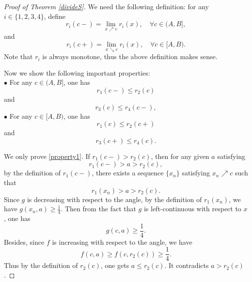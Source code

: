 \documentclass[oneside,english,a4wide]{amsart}
\numberwithin{equation}{section}
\numberwithin{figure}{section}
\theoremstyle{plain}
\theoremstyle{plain}
\theoremstyle{definition}
\theoremstyle{plain}
\theoremstyle{remark}
\theoremstyle{definition}
\theoremstyle{remark}
\theoremstyle{definition}
\newcommand{\8}{\infty}
\begin{document}
\begin{proof}[Proof of Theorem \ref{divideS}]
	
	
	
	\smallskip
	
	We need the following definition: for any $i\in\{1,2,3,4\}$, define
	\begin{equation*}
		r_i(c-)=\lim_{x\nearrow c}r_i(x),\quad \forall c\in (A,B],
	\end{equation*}
    and
	\begin{equation*}
		r_i(c+)=\lim_{x\searrow c}r_i(x),\quad \forall c\in [A,B).
	\end{equation*}
	Note that $r_i$ is always monotone, thus the above definition makes sense. 
	
	\smallskip
	
	Now we show the following important properties:\\
	$\bullet$ For any $c\in (A,B]$, one has 
	\begin{equation}\label{property1}
		r_1(c-)\le r_2(c)
	\end{equation}
     and 
     \begin{equation}\label{property3}
     	r_3(c)\le r_4(c-),
     \end{equation}
     $\bullet$ For any $c\in [A,B)$, one has
     \begin{equation}\label{property2}
     	r_1(c)\le r_2(c+)
     \end{equation}
     and 
     \begin{equation}\label{property4}
     	r_3(c+)\le r_4(c).
     \end{equation}

	We only prove \eqref{property1}. If $r_1(c-)>r_2(c)$, then for any given $a$ satisfying
	\begin{equation*}
		r_1(c-)>a>r_2(c),
	\end{equation*}
	by the definition of $r_1(c-)$, there exists a sequence $\{x_n\}$ satisfying $x_n\nearrow c$ such that
	\begin{equation*}
		r_1(x_n)>a>r_2(c).
	\end{equation*}
	Since $g$ is decreasing with respect to the angle, by the definition of $r_1(x_n)$, we have $g(x_n,a)\ge \frac{1}{4}$. Then from the fact that $g$ is left-continuous with respect to $x$, one has
	\begin{equation*}
		g(c,a)\ge \frac{1}{4}.
	\end{equation*}
	Besides, since $f$ is increasing with respect to the angle, we have
	\begin{equation*}
		f(c,a)\ge f(c,r_2(c))\ge \frac{1}{4}.
	\end{equation*}
	Thus by the definition of $r_2(c)$, one gets $a\le r_2(c)$. It contradicts $a>r_2(c)$. 
	

\end{proof}
\end{document}
